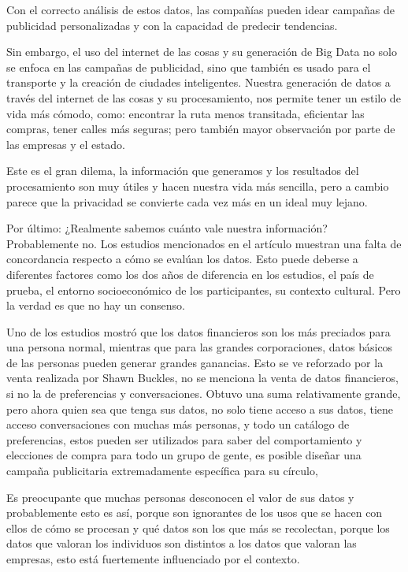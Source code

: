 \documentclass[12pt]{report}
\begin{document}
\begin{enumerate}[label=\textbf{\arabic*.}, leftmargin=*]
Con el correcto análisis de estos datos, las compañías pueden idear campañas de publicidad personalizadas y con la capacidad de predecir tendencias.

Sin embargo, el uso del internet de las cosas y su generación de Big Data no solo se enfoca en las campañas de publicidad, sino que también es usado para el transporte y  la creación de ciudades inteligentes. Nuestra generación de datos a través del internet de las cosas y su procesamiento, nos permite tener un estilo de vida más cómodo, como: encontrar la ruta menos transitada, eficientar las compras, tener calles más seguras; pero también mayor observación por parte de las empresas y el estado.

Este es el gran dilema, la información que generamos y los resultados del procesamiento son muy útiles y hacen nuestra vida más sencilla, pero a cambio parece que la privacidad se convierte cada vez más en un ideal muy lejano.

Por último: ¿Realmente sabemos cuánto vale nuestra información? Probablemente no. Los estudios mencionados en el artículo muestran una falta de concordancia respecto a cómo se evalúan los datos. Esto puede deberse a diferentes factores como los dos años de diferencia en los estudios, el país de prueba, el entorno socioeconómico de los participantes, su contexto cultural. Pero la verdad es que no hay un consenso.

Uno de los estudios mostró que los datos financieros son los más preciados para una persona normal, mientras que para las grandes corporaciones, datos básicos de las personas pueden generar grandes ganancias. Esto se ve reforzado por la venta realizada por Shawn Buckles,  no se menciona la venta de datos financieros, si no la de preferencias y conversaciones. Obtuvo una suma relativamente grande, pero ahora quien sea que tenga sus datos, no solo tiene acceso a sus datos, tiene acceso conversaciones con muchas más personas, y todo un catálogo de preferencias, estos pueden ser utilizados para saber del comportamiento y elecciones de compra para todo un grupo de gente, es posible diseñar una campaña publicitaria extremadamente específica para su círculo,

Es preocupante que muchas personas desconocen el valor de sus datos y probablemente esto es así, porque son ignorantes de los usos que se hacen con ellos de cómo se procesan y qué datos son los que más se recolectan,  porque los datos que valoran los individuos son distintos a los datos que valoran las empresas, esto está fuertemente influenciado por el contexto.\\


\end{enumerate}
\end{document}
